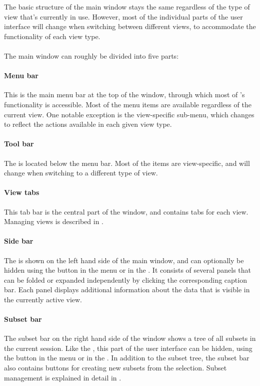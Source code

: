 The basic structure of the \sh main window stays the same regardless of the type of view that's currently in use.
However, most of the individual parts of the user interface will change when switching between different views, to accommodate the functionality of each view type.
\\
\\
The main window can roughly be divided into five parts:

\paragraph{Menu bar}
This is the main menu bar at the top of the \sh window, through which most of \sh's functionality is accessible.
Most of the menu items are available regardless of the current view.
One notable exception is the view-specific sub-menu, which changes to reflect the actions available in each given view type.

\paragraph{Tool bar}
The \tbar is located below the menu bar.
Most of the \tbar items are view-specific, and will change when switching to a different type of view.

\paragraph{View tabs}
This tab bar is the central part of the \sh window, and contains tabs for each view.
Managing views is described in .

\paragraph{Side bar}
The \sbar is shown on the left hand side of the main window, and can optionally be hidden using the  button in the  menu or in the \tbar.
It consists of several panels that can be folded or expanded independently by clicking the corresponding caption bar.
Each panel displays additional information about the data that is visible in the currently active view.

\paragraph{Subset bar}
The subset bar on the right hand side of the window shows a tree of all subsets in the current session.
Like the \sbar, this part of the user interface can be hidden, using the  button in the  menu or in the \tbar.
In addition to the subset tree, the subset bar also contains buttons for creating new subsets from the selection.
Subset management is explained in detail in .
